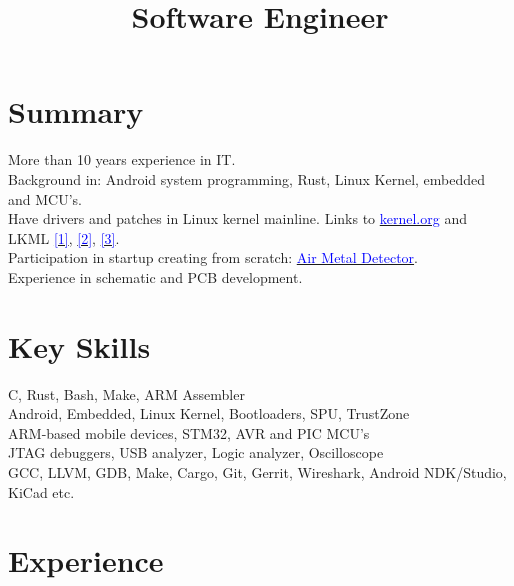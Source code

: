 \documentclass[11pt,a4paper]{moderncv}
\title{Software Engineer}
\begin{document}
\maketitle

\section{Summary}

More than 10 years experience in IT.\\
Background in: Android system programming, Rust, Linux Kernel, embedded and MCU's.\\
Have drivers and patches in Linux kernel mainline. Links to
\href{https://git.kernel.org/cgit/linux/kernel/git/torvalds/linux.git/log/?id=refs\%2Ftags\%2Fv4.2-rc4&qt=author&q=Oleksandr+Kravchenko}{\textcolor{blue}{kernel.org}}
and LKML
\href{https://lkml.org/lkml/2013/7/22/259}{\textcolor{blue}{[1]}},
\href{https://lkml.org/lkml/2013/8/28/187}{\textcolor{blue}{[2]}},
\href{https://lkml.org/lkml/2013/7/19/99}{\textcolor{blue}{[3]}}.\\
Participation in startup creating from scratch: \href{https://www.kickstarter.com/projects/airmetaldetectors/air-metal-detector-the-smart-bluetooth-metal-detec}{\textcolor{blue}{Air Metal Detector}}.\\
Experience in schematic and PCB development.

\section{Key Skills}

C, Rust, Bash, Make, ARM Assembler\\
Android, Embedded, Linux Kernel, Bootloaders, SPU, TrustZone\\ 
ARM-based mobile devices, STM32, AVR and PIC MCU’s\\
JTAG debuggers, USB analyzer, Logic analyzer, Oscilloscope\\
GCC, LLVM, GDB, Make, Cargo, Git, Gerrit, Wireshark, Android NDK/Studio, KiCad etc.

\section{Experience}
\end{document}
